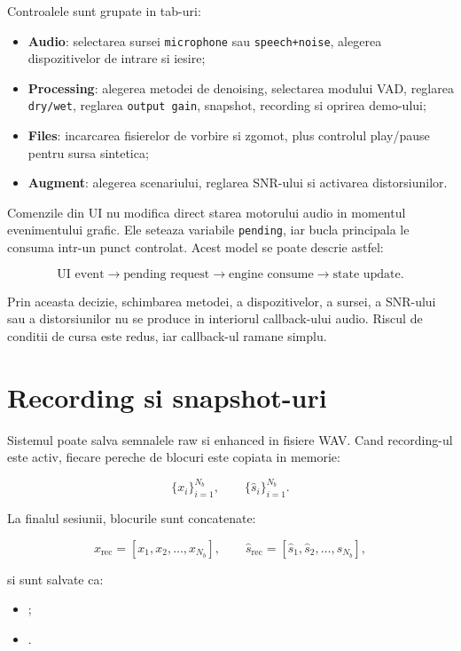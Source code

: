 Controalele sunt grupate in tab-uri:

\begin{itemize}
    \item \textbf{Audio}: selectarea sursei \texttt{microphone} sau
    \texttt{speech+noise}, alegerea dispozitivelor de intrare si iesire;
    \item \textbf{Processing}: alegerea metodei de denoising, selectarea modului
    VAD, reglarea \texttt{dry/wet}, reglarea \texttt{output gain}, snapshot,
    recording si oprirea demo-ului;
    \item \textbf{Files}: incarcarea fisierelor de vorbire si zgomot, plus
    controlul play/pause pentru sursa sintetica;
    \item \textbf{Augment}: alegerea scenariului, reglarea SNR-ului si activarea
    distorsiunilor.
\end{itemize}

Comenzile din UI nu modifica direct starea motorului audio in momentul
evenimentului grafic. Ele seteaza variabile \texttt{pending}, iar bucla principala
le consuma intr-un punct controlat. Acest model se poate descrie astfel:

\[
\text{UI event} \rightarrow \text{pending request}
\rightarrow \text{engine consume} \rightarrow \text{state update}.
\]

Prin aceasta decizie, schimbarea metodei, a dispozitivelor, a sursei, a SNR-ului
sau a distorsiunilor nu se produce in interiorul callback-ului audio. Riscul de
conditii de cursa este redus, iar callback-ul ramane simplu.

\section{Recording si snapshot-uri}

Sistemul poate salva semnalele raw si enhanced in fisiere WAV. Cand recording-ul
este activ, fiecare pereche de blocuri este copiata in memorie:

\[
\{x_i\}_{i=1}^{N_b},
\qquad
\{\hat{s}_i\}_{i=1}^{N_b}.
\]

La finalul sesiunii, blocurile sunt concatenate:

\[
x_{\text{rec}} =
[x_1, x_2, \ldots, x_{N_b}],
\qquad
\hat{s}_{\text{rec}} =
[\hat{s}_1, \hat{s}_2, \ldots, \hat{s}_{N_b}],
\]

si sunt salvate ca:

\begin{itemize}
    \item {};
    \item {}.
\end{itemize}

